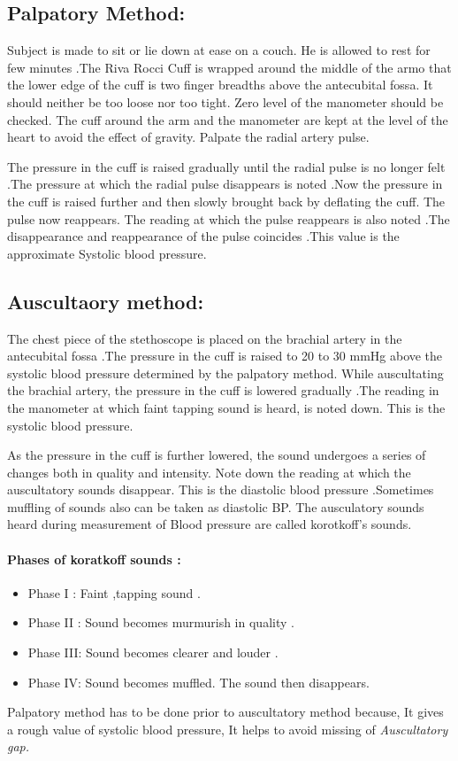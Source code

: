 \documentclass[a4paper,12pt]{book}
\begin{document}
\subsection*{Palpatory Method:}
Subject is made to sit or lie down at ease on a couch. He is allowed to rest for few minutes .The Riva Rocci Cuff is wrapped around the middle of the armo that the lower edge of the cuff is two finger breadths above the antecubital fossa. It should neither be too loose nor too tight. Zero level of the manometer should be checked. The cuff around the arm and the manometer are kept at the level of the heart to avoid the effect of gravity. Palpate the radial artery pulse.
\par
The pressure in the cuff is raised gradually until the radial pulse is no longer felt .The pressure at which the radial pulse disappears is noted .Now the pressure in the cuff is raised further and then slowly brought back by deflating the cuff. The pulse now reappears. The reading at which the pulse reappears is also noted .The disappearance and reappearance of the pulse coincides .This value is the approximate Systolic blood pressure.
\subsection*{Auscultaory method:}
The chest piece of the stethoscope is placed on the brachial artery in the antecubital fossa .The pressure in the cuff is raised to 20 to 30 mmHg above the systolic blood pressure determined by the palpatory method. While auscultating the brachial artery, the pressure in the cuff is lowered gradually .The reading in the manometer at which faint tapping sound is heard, is noted down. This is the systolic blood pressure.
\par
As the pressure in the cuff is further lowered, the sound undergoes a series of changes both in quality and intensity. Note down the reading at which the auscultatory sounds disappear. This is the diastolic blood pressure .Sometimes muffling of sounds also can be taken as diastolic BP. The ausculatory sounds heard during measurement of Blood pressure are called korotkoff’s sounds.
\paragraph{Phases of koratkoff sounds :}
\begin{itemize}
\item[]Phase I : Faint ,tapping sound .
\item[]Phase II : Sound becomes murmurish in quality .
\item[]Phase III: Sound becomes clearer and louder .
\item[]Phase IV: Sound becomes muffled. The sound then disappears.
\end{itemize}
\par
Palpatory method has to be done prior to auscultatory method because,
It gives a rough value of systolic blood pressure, It helps to avoid missing of \emph{Auscultatory gap.}
\end{document}
